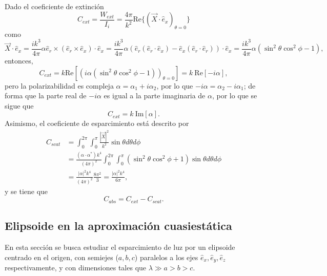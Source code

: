 \documentclass[paper=letter, fontsize=12pt,]{article}
\newcommand{\uvec}[1]{\hat{e}_{#1}}
\begin{document}
Dado el coeficiente de extinción \cite{Bohren}
\begin{equation}
    C_{ext}=\frac{W_{ext}}{I_i}=\frac{4\pi}{k^2} \mbox{Re}\{(\Vec{X}\cdot\hat{e}_x)_{\theta=0}\}    
\end{equation}
como
\begin{equation}
    \Vec{X}\cdot\hat{e}_x=\frac{ik^3}{4\pi}\alpha \hat{e}_r\times(\hat{e}_r\times \hat{e}_x)\cdot\hat{e}_x=\frac{ik^3}{4\pi}\alpha\left(\hat{e}_r(\hat{e}_r\cdot \hat{e}_x)-\hat{e}_x(\hat{e}_r\cdot \hat{e}_r)\right)\cdot\hat{e}_x=\frac{ik^3}{4\pi}\alpha(\sin^2\theta\cos^2\phi-1),    
\end{equation}
entonces, 
\begin{equation}
    C_{ext}=k \mbox{Re}\left[\left(i\alpha(\sin^2\theta\cos^2\phi-1)\right)_{\theta=0}\right]=k\:\mbox{Re}\left[-i\alpha\right],
\end{equation}
pero la polarizabilidad es compleja $\alpha=\alpha_1+i\alpha_2$, por lo que $-i\alpha=\alpha_2-i\alpha_1$; de forma que la parte real de $-i\alpha$ es igual a la parte imaginaria de $\alpha$, por lo que se sigue que
\begin{equation}
    C_{ext}=k\: \mbox{Im}[\alpha].    
\end{equation}
Asimismo, el coeficiente de esparcimiento está descrito por \cite{Bohren}
\begin{align}
    C_{scat}&=\int_{0}^{2\pi}\int_0^{\pi}\frac{|\Vec{X}|^2}{k^2}\sin\theta d\theta d\phi\nonumber\\
    &=\frac{(\alpha\cdot\alpha^*)k^4}{(4\pi)^2}\int_0^{2\pi}\int_0^{\pi}(\sin^2\theta\cos^2\phi+1)\sin\theta d\theta d\phi\nonumber\\
    &=\frac{|\alpha|^2k^4}{(4\pi)^2}\frac{8\pi^2}{3}=\frac{|\alpha|^2k^4}{6\pi},
\end{align}
y se tiene que \cite{Bohren}
\begin{equation}
    C_{abs}=C_{ext}-C_{scat}.    
\end{equation}



\subsection{Elipsoide en la aproximación cuasiestática}
En esta sección se busca estudiar el esparcimiento de luz por un elipsoide centrado en el origen, con semiejes ($a,b,c$) paralelos a los ejes $\uvec{x},\uvec{y},\uvec{z}$ respectivamente, y con dimensiones tales que $\lambda\gg a>b>c$.\\
\end{document}
